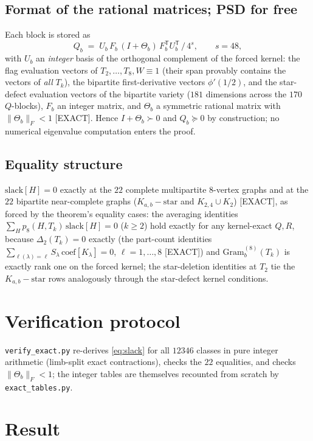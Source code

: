\documentclass[11pt]{amsart}
\newcommand{\Wone}{W\!\equiv\!1}
\begin{document}
\subsection{Format of the rational matrices; PSD for free}
Each block is stored as
\[
Q_b \;=\; U_b\,F_b\,(I+\Theta_b)\,F_b^{\mathsf T}U_b^{\mathsf T}\,/\,4^{s},
\qquad s=48,
\]
with $U_b$ an \emph{integer} basis of the orthogonal complement of the
forced kernel: the flag evaluation vectors of $T_2,\dots,T_8,\Wone$ (their
span provably contains the vectors of \emph{all} $T_k$), the bipartite
first-derivative vectors $\phi'(1/2)$, and the star-defect evaluation
vectors of the bipartite variety ($181$ dimensions across the $170$
$Q$-blocks), $F_b$ an integer matrix, and $\Theta_b$ a symmetric rational
matrix with
$\|\Theta_b\|_F<1$ [EXACT].  Hence $I+\Theta_b\succ0$ and $Q_b\succeq0$ by
construction; no numerical eigenvalue computation enters the proof.

\subsection{Equality structure}
$\mathrm{slack}[H]=0$ exactly at the $22$ complete multipartite $8$-vertex
graphs and at the $22$ bipartite near-complete graphs
($K_{a,b}-\mathrm{star}$ and $K_{2,4}\cup K_2$) [EXACT], as forced by the
theorem's equality cases: the averaging identities
$\sum_H p_8(H,T_k)\,\mathrm{slack}[H]=0$ ($k\ge2$) hold exactly for any
kernel-exact $Q,R$, because $\Delta_2(T_k)=0$ exactly (the part-count
identities $\sum_{\ell(\lambda)=\ell}S_\lambda\,
\mathrm{coef}[K_\lambda]=0$, $\ell=1,\dots,8$ [EXACT]) and
$\mathrm{Gram}^{(8)}_b(T_k)$ is exactly rank one on the forced kernel;
the star-deletion identities at $T_2$ tie the $K_{a,b}-\mathrm{star}$
rows analogously through the star-defect kernel conditions.

\section{Verification protocol}
\texttt{verify\_exact.py} re-derives \eqref{eq:slack} for all $12346$
classes in pure integer arithmetic (limb-split exact contractions), checks
the $22$ equalities, and checks $\|\Theta_b\|_F<1$; the integer tables are
themselves recounted from scratch by \texttt{exact\_tables.py}.

\section{Result}
\end{document}

